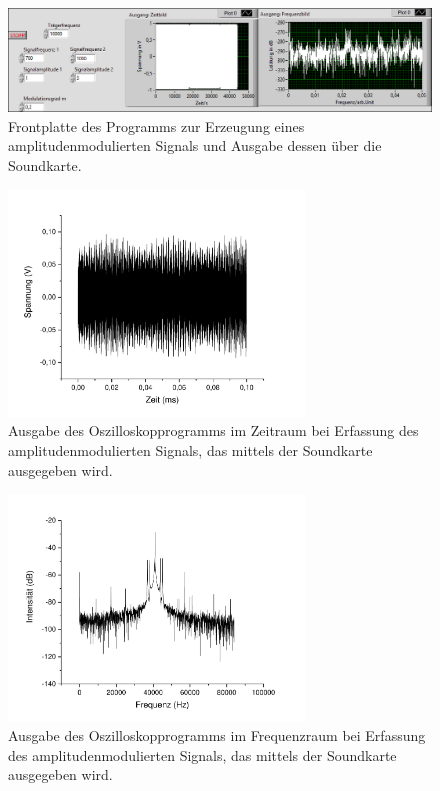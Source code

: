 \documentclass[
a4paper,
12pt,
pagesize,
ngerman
]{scrartcl}
\begin{document}
	\begin{figure}[H]  
		\includegraphics[width=1\textwidth]{EIRE2018Dateien/Tag3/Soundkarteoutoszi/AMp}
		\centering
		\caption{
			Frontplatte des Programms zur Erzeugung eines amplitudenmodulierten Signals und Ausgabe dessen über die Soundkarte. %
		}
		\label{fig_tag3_am_soundkarte_front}
		\centering
	\end{figure}

	\begin{figure}[H]  
		\includegraphics[width=0.7\textwidth]{Origin-Files/AM-Zeit}
		\centering
		\caption{
			Ausgabe des Oszilloskopprogramms im Zeitraum bei Erfassung des amplitudenmodulierten Signals, das mittels der Soundkarte ausgegeben wird.
		}
		\label{fig_tag3_am_soundkarte_zeit}
		\centering
	\end{figure}
	
	\begin{figure}[H]  
		\includegraphics[width=0.7\textwidth]{Origin-Files/AM-Freq-Hann}
		\centering
		\caption{
			Ausgabe des Oszilloskopprogramms im Frequenzraum bei Erfassung des amplitudenmodulierten Signals, das mittels der Soundkarte ausgegeben wird.
		}
		\label{fig_tag3_am_soundkarte_freq}
		\centering
	\end{figure}
\end{document}
